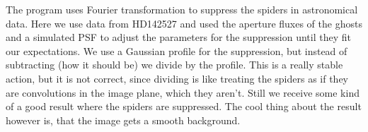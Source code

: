 The program uses Fourier transformation to suppress the spiders in astronomical data.
Here we use data from HD142527 and used the aperture fluxes of the ghosts and 
a simulated PSF to adjust the parameters for the suppression until they fit our
expectations. 
We use a Gaussian profile for the suppression, but instead of subtracting (how
it should be) we divide by the profile. This is a really stable action, but it 
is not correct, since dividing is like treating the spiders as if they are 
convolutions in the image plane, which they aren't. Still we receive some kind 
of a good result where the spiders are suppressed. The cool thing about the 
result however is, that the image gets a smooth background.
